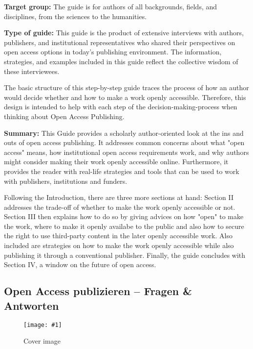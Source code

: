 \documentclass{article}
\newlength{\imgwidth}
\newcommand\scaledgraphics[2]{%
                
\settowidth{\imgwidth}{\texttt{[image: \#1]}}%
                
\setlength{\imgwidth}{\minof{\imgwidth}{#2\textwidth}}%
                
\texttt{[image: \#1]}%
                
}
\begin{document}
\autocite{rubow_understanding_2015}


\textbf{Target group: }The guide is for authors of all backgrounds, fields, and disciplines, from the sciences to the humanities.


\textbf{Type of guide: }This guide is the product of extensive interviews with authors, publishers, and institutional representatives who shared their perspectives on open access options in today’s publishing environment. The information, strategies, and examples included in this guide reflect the collective wisdom of these interviewees.


The basic structure of this step-by-step guide traces the process of how an author would decide whether and how to make a work openly accessible. Therefore, this design is intended to help with each step of the decision-making-process when thinking about Open Access Publishing. 


\textbf{Summary: }This Guide provides a scholarly author-oriented look at the ins and outs of open access publishing. It addresses common concerns about what "open access" means, how institutional open access requirements work, and why authors might consider making their work openly accessible online. Furthermore, it provides the reader with real-life strategies and tools that can be used to work with publishers, institutions and funders.


Following the Introduction, there are three more sections at hand: Section II addresses the trade-off of whether to make the work openly accessible or not. Section III then explains how to do so by giving advices on how "open" to make the work, where to make it openly availabe to the public and also how to secure the right to use third-party content in the later openly accessible work. Also included are strategies on how to make the work openly accessible while also publishing it through a conventional publisher. Finally, the guide concludes with Section IV, a window on the future of open access.


\subsection{Open Access publizieren – Fragen \& Antworten}\label{H4741497}


\begin{figure}
\scaledgraphics{f61a96b6-6ada-4caf-b8f3-1ef6ac943b93.png}{1}
\caption*{Cover image}\label{F90452781}
\end{figure}
\end{document}
